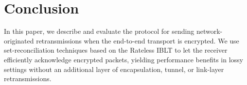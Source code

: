 
\section{Conclusion}

In this paper, we describe and evaluate the \Sys protocol for sending
network-originated retransmissions when the end-to-end transport is encrypted.
We use set-reconciliation techniques
based on the Rateless IBLT to let the receiver efficiently acknowledge
encrypted packets, yielding performance benefits in lossy settings
without an additional layer of encapsulation, tunnel, or link-layer
retransmissions.
